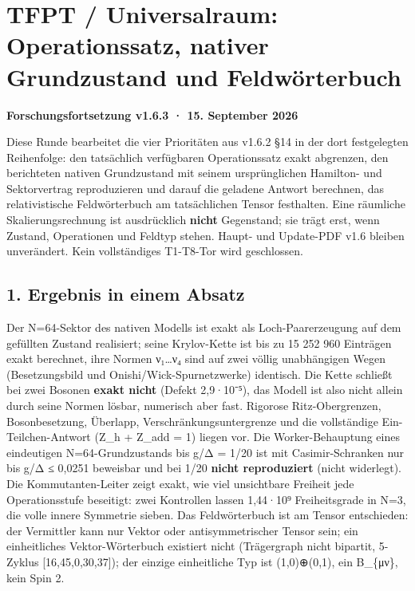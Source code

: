 \section{TFPT / Universalraum: Operationssatz, nativer Grundzustand und
Feldwörterbuch}\label{tfpt-universalraum-operationssatz-nativer-grundzustand-und-feldwuxf6rterbuch}

\textbf{Forschungsfortsetzung v1.6.3 · 15. September 2026}

Diese Runde bearbeitet die vier Prioritäten aus v1.6.2 §14 in der dort
festgelegten Reihenfolge: den tatsächlich verfügbaren Operationssatz
exakt abgrenzen, den berichteten nativen Grundzustand mit seinem
ursprünglichen Hamilton- und Sektorvertrag reproduzieren und darauf die
geladene Antwort berechnen, das relativistische Feldwörterbuch am
tatsächlichen Tensor festhalten. Eine räumliche Skalierungsrechnung ist
ausdrücklich \textbf{nicht} Gegenstand; sie trägt erst, wenn Zustand,
Operationen und Feldtyp stehen. Haupt- und Update-PDF v1.6 bleiben
unverändert. Kein vollständiges T1-T8-Tor wird geschlossen.

\subsection{1. Ergebnis in einem Absatz}\label{ergebnis-in-einem-absatz}

Der N=64-Sektor des nativen Modells ist exakt als Loch-Paarerzeugung auf
dem gefüllten Zustand realisiert; seine Krylov-Kette ist bis zu 15 252
960 Einträgen exakt berechnet, ihre Normen ν₁\ldots ν₄ sind auf zwei
völlig unabhängigen Wegen (Besetzungsbild und Onishi/Wick-Spurnetzwerke)
identisch. Die Kette schließt bei zwei Bosonen \textbf{exakt nicht}
(Defekt 2,9·10⁻⁵), das Modell ist also nicht allein durch seine Normen
lösbar, numerisch aber fast. Rigorose Ritz-Obergrenzen, Bosonbesetzung,
Überlapp, Verschränkungsuntergrenze und die vollständige
Ein-Teilchen-Antwort (Z\_h + Z\_add = 1) liegen vor. Die
Worker-Behauptung eines eindeutigen N=64-Grundzustands bis g/Δ = 1/20
ist mit Casimir-Schranken nur bis g/Δ ≤ 0,0251 beweisbar und bei 1/20
\textbf{nicht reproduziert} (nicht widerlegt). Die Kommutanten-Leiter
zeigt exakt, wie viel unsichtbare Freiheit jede Operationsstufe
beseitigt: zwei Kontrollen lassen 1,44·10⁹ Freiheitsgrade in N=3, die
volle innere Symmetrie sieben. Das Feldwörterbuch ist am Tensor
entschieden: der Vermittler kann nur Vektor oder antisymmetrischer
Tensor sein; ein einheitliches Vektor-Wörterbuch existiert nicht
(Trägergraph nicht bipartit, 5-Zyklus {[}16,45,0,30,37{]}); der einzige
einheitliche Typ ist (1,0)⊕\allowbreak{}(0,1), ein B\_\{μν\}, kein Spin 2.


